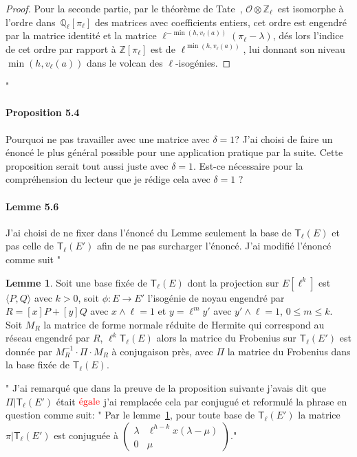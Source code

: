 \documentclass[10pt,a4paper]{article}
\theoremstyle{plain}
\theoremstyle{definition}
\theoremstyle{definition}
\newtheorem{lem}[thm]{Lemme}
\theoremstyle{definition}
\theoremstyle{definition}
\theoremstyle{definition}
\theoremstyle{remark}
\theoremstyle{remark}
\theoremstyle{definition}
\begin{document}
{\begin{proof}
Pour la seconde partie, par le théorème de 
Tate~\cite[Isogeny theorem III.7.7 (a)]{Silv1}, $\mathcal{O} \otimes 
 \mathbb{Z}_{\ell}$~est isomorphe à l'ordre dans~$\mathbb{Q}_{\ell}[\pi_{\ell}]$
des matrices avec coefficients entiers, cet ordre est engendré par la matrice 
 identité et la matrice $\ell^{-\min (h, v_\ell(a))} (\pi_{\ell}-\lambda)$, dés 
 lors l'indice de cet ordre par rapport à $\mathbb{Z}[\pi_{\ell}]$ est de 
$\ell^{\min (h, v_\ell(a))}$, lui donnant son niveau $\min (h, v_\ell(a))$ dans 
 le volcan des $\ell$-isogénies.
\end{proof}
"}

\paragraph{Proposition 5.4}{Pourquoi ne pas travailler avec une matrice avec 
$\delta = 1$? J'ai choisi de faire un énoncé le plus général possible pour une
application pratique par la suite. Cette proposition serait tout aussi juste 
avec $\delta = 1$. Est-ce nécessaire pour la compréhension du lecteur que je 
rédige cela avec $\delta = 1$ ?}

\paragraph{Lemme 5.6}{J'ai choisi de ne fixer dans l'énoncé du Lemme seulement 
la base de $\mathsf{T}_{\ell}(E)$ et pas celle de $\mathsf{T}_{\ell}(E')$ afin 
de ne pas surcharger l'énoncé. J'ai modifié l'énoncé comme suit "
\begin{lem}
\label{lem:iso:con}
Soit une base fixée de $\mathsf{T}_{\ell}(E)$ dont la projection sur 
$E[\ell^{k}]$ est $\langle P, Q \rangle$ avec $k>0$, soit $\phi:E 
\rightarrow E'$ l'isogénie de noyau engendré par $R=[x]P+[y]Q$  avec $x\wedge 
\ell =1$ et $y=\ell^my'$ avec $y' \wedge \ell =1$, $0 \leqslant m \leqslant k$.
Soit $M_R$ la matrice de forme normale réduite de Hermite qui correspond au réseau 
engendré par $R$, $\ell^k\mathsf{T}_{\ell}(E)$ alors la matrice du Frobenius sur 
$\mathsf{T}_{\ell}(E')$ est donnée par $M_R^{-1} \cdot \Pi \cdot M_R$ à 
conjugaison près, avec $\Pi$ la matrice du Frobenius dans la base fixée de 
$\mathsf{T}_{\ell}(E)$.
\end{lem}" J'ai remarqué que dans la preuve de la proposition suivante j'avais
dit que $\Pi|\mathsf{T}_{\ell}(E')$ était $\color{red}\text{égale}$ j'ai 
remplacée cela par conjugué et reformulé la phrase en question comme suit:
"  Par le lemme~\ref{lem:iso:con}, pour toute base de 
$\mathsf{T}_{\ell}(E')$ la matrice 
$\pi|\mathsf{T}_{\ell}(E')$ est conjuguée à $\left ( \begin{smallmatrix}\lambda & \ell^{h-k} 
x (\lambda-\mu)\\ 0 & \mu \end{smallmatrix}\right )$."}
\end{document}
